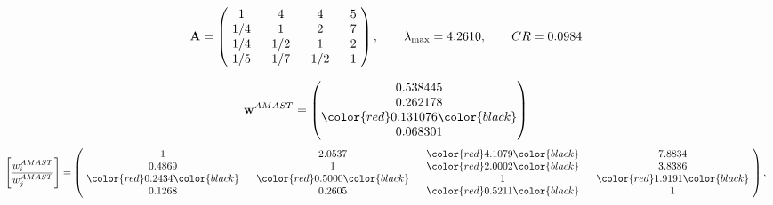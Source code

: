 \begin{example}
\begin{equation*}
\mathbf{A} =
\begin{pmatrix}
$\,\,$ 1 $\,\,$ & $\,\,$4$\,\,$ & $\,\,$4$\,\,$ & $\,\,$5 $\,\,$ \\
$\,\,$ 1/4$\,\,$ & $\,\,$ 1 $\,\,$ & $\,\,$2$\,\,$ & $\,\,$7 $\,\,$ \\
$\,\,$ 1/4$\,\,$ & $\,\,$ 1/2$\,\,$ & $\,\,$ 1 $\,\,$ & $\,\,$2 $\,\,$ \\
$\,\,$ 1/5$\,\,$ & $\,\,$ 1/7$\,\,$ & $\,\,$ 1/2$\,\,$ & $\,\,$ 1  $\,\,$ \\
\end{pmatrix},
\qquad
\lambda_{\max} =
4.2610,
\qquad
CR = 0.0984
\end{equation*}

\begin{equation*}
\mathbf{w}^{AMAST} =
\begin{pmatrix}
0.538445\\
0.262178\\
\color{red} 0.131076\color{black} \\
0.068301
\end{pmatrix}\end{equation*}
\begin{equation*}
\left[ \frac{{w}^{AMAST}_i}{{w}^{AMAST}_j} \right] =
\begin{pmatrix}
$\,\,$ 1 $\,\,$ & $\,\,$2.0537$\,\,$ & $\,\,$\color{red} 4.1079\color{black} $\,\,$ & $\,\,$7.8834$\,\,$ \\
$\,\,$0.4869$\,\,$ & $\,\,$ 1 $\,\,$ & $\,\,$\color{red} 2.0002\color{black} $\,\,$ & $\,\,$3.8386  $\,\,$ \\
$\,\,$\color{red} 0.2434\color{black} $\,\,$ & $\,\,$\color{red} 0.5000\color{black} $\,\,$ & $\,\,$ 1 $\,\,$ & $\,\,$\color{red} 1.9191\color{black}  $\,\,$ \\
$\,\,$0.1268$\,\,$ & $\,\,$0.2605$\,\,$ & $\,\,$\color{red} 0.5211\color{black} $\,\,$ & $\,\,$ 1  $\,\,$ \\
\end{pmatrix},
\end{equation*}


\end{example}
